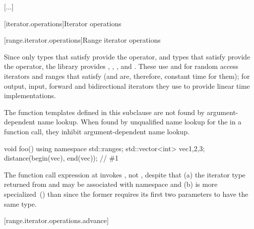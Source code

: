 [...] 

[iterator.operations]{Iterator operations}

\begin{addedblock}
[range.iterator.operations]{Range iterator operations}

\pnum
Since only types that satisfy
 provide the \tcode{+} operator, and
types that satisfy  provide the \tcode{-}
operator, the library provides 
, , , and .
These
 
use
\tcode{+}
and
\tcode{-}
for random access iterators and ranges that satisfy  (and are,
therefore, constant time for them); for output, input, forward and bidirectional
iterators they use
\tcode{++}
to provide linear time
implementations.

{\color{newclr}
\pnum
The function templates defined in this subclause are not found by argument-dependent
name lookup. When found by
unqualified name lookup for the
 in a function call, they
inhibit argument-dependent name lookup.

\begin{example}
\begin{codeblock}
void foo() {
    using namespace std::ranges;
    std::vector<int> vec{1,2,3};
    distance(begin(vec), end(vec)); // \#1
}
\end{codeblock}
The function call expression at  invokes ,
not , despite that (a) the iterator type returned from 
and  may be associated with namespace  and (b)
 is more specialized~() than
 since the former requires its first two parameters
to have the same type.
\end{example}
} %

[range.iterator.operations.advance]{}
%
\pnum
{}


\end{addedblock}
